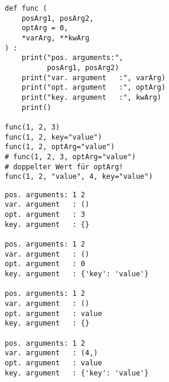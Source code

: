 
\begin{frame}[fragile]
%
\begin{tcbraster}[raster columns=2,
                  raster equal height,
                  nobeforeafter,
                  raster column skip=0.5cm]
\begin{codebox}
\begin{verbatim}
def func (
    posArg1, posArg2,
    optArg = 0,
    *varArg, **kwArg
) :
    print("pos. arguments:",
          posArg1, posArg2)
    print("var. argument   :", varArg)
    print("opt. argument   :", optArg)
    print("key. argument   :", kwArg)
    print()

func(1, 2, 3)
func(1, 2, key="value")
func(1, 2, optArg="value")
# func(1, 2, 3, optArg="value")
# doppelter Wert für optArg!
func(1, 2, "value", 4, key="value")
\end{verbatim}
\end{codebox}
%
\begin{cmdbox}
\begin{verbatim}
pos. arguments: 1 2
var. argument   : ()
opt. argument   : 3
key. argument   : {}

pos. arguments: 1 2
var. argument   : ()
opt. argument   : 0
key. argument   : {'key': 'value'}

pos. arguments: 1 2
var. argument   : ()
opt. argument   : value
key. argument   : {}

pos. arguments: 1 2
var. argument   : (4,)
opt. argument   : value
key. argument   : {'key': 'value'}
\end{verbatim}
\end{cmdbox}
\end{tcbraster}
%
\end{frame}


